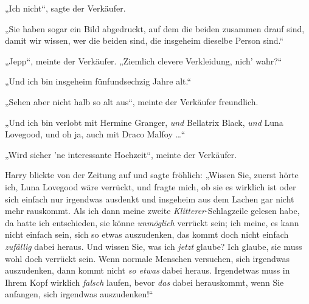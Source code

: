 „Ich nicht“, sagte der Verkäufer.

„Sie haben sogar ein Bild abgedruckt, auf dem die beiden zusammen drauf sind, damit wir wissen, wer die beiden sind, die insgeheim dieselbe Person sind.“

„Jepp“, meinte der Verkäufer.
„Ziemlich clevere Verkleidung, nich’ wahr?“

„Und ich bin insgeheim fünfundsechzig Jahre alt.“

„Sehen aber nicht halb so alt aus“, meinte der Verkäufer freundlich.

„Und ich bin verlobt mit Hermine Granger, \emph{und} Bellatrix Black, \emph{und} Luna Lovegood, und oh ja, auch mit Draco Malfoy …“

„Wird sicher ’ne interessante Hochzeit“, meinte der Verkäufer.

Harry blickte von der Zeitung auf und sagte fröhlich:
„Wissen Sie, zuerst hörte ich, Luna Lovegood wäre verrückt, und fragte mich, ob sie es wirklich ist oder sich einfach nur irgendwas ausdenkt und insgeheim aus dem Lachen gar nicht mehr rauskommt. Als ich dann meine zweite \emph{Klitterer}-Schlagzeile gelesen habe, da hatte ich entschieden, sie könne \emph{unmöglich} verrückt sein; ich meine, es kann nicht einfach sein, sich so etwas auszudenken, das kommt doch nicht einfach \emph{zufällig} dabei heraus. Und wissen Sie, was ich \emph{jetzt} glaube? Ich glaube, sie muss wohl doch verrückt sein. Wenn normale Menschen versuchen, sich irgendwas auszudenken, dann kommt nicht \emph{so etwas} dabei heraus. Irgendetwas muss in Ihrem Kopf wirklich \emph{falsch} laufen, bevor \emph{das} dabei herauskommt, wenn Sie anfangen, sich irgendwas auszudenken!“

